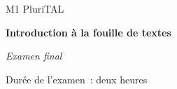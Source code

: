 \documentclass[a4paper, 11pt]{article}
\title{\titlepagetitle}
\author{\myname <\mymail>}
\date{\docdate}
\begin{document}
{
   \begin{center}
      \large{M1 PluriTAL}\par
      \vspace{1em}
      \huge\textbf{Introduction à la fouille de textes}\par
      \vspace{0.5em}
      \LARGE\textit{Examen final}\par
      \vspace{0.5em}
      \Large\thedate
   \end{center}
}

Durée de l'examen : deux heures
\end{document}
